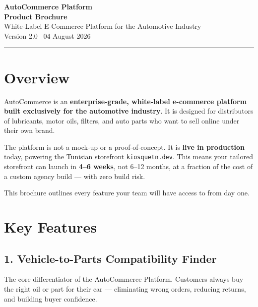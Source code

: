 \documentclass[11pt,a4paper]{article}
\begin{document}
\begin{center}
  {\Huge\bfseries\color{accent}AutoCommerce Platform}\\[0.4em]
  {\large\bfseries Product Brochure}\\[0.2em]
  {\normalsize\color{gray}White-Label E-Commerce Platform for the
  Automotive Industry}\\[0.3em]
  {\normalsize Version 2.0 \textbar\ 04 August 2026}\\[1.2em]
  \rule{\textwidth}{1.2pt}
\end{center}

\section{Overview}

AutoCommerce is an \textbf{enterprise-grade, white-label e-commerce
platform built exclusively for the automotive industry}. It is
designed for distributors of lubricants, motor oils, filters, and
auto parts who want to sell online under their own brand.

The platform is not a mock-up or a proof-of-concept. It is
\textbf{live in production} today, powering the Tunisian storefront
\texttt{kiosquetn.dev}. This means your tailored storefront can launch
in \textbf{4--6 weeks}, not 6--12 months, at a fraction of the cost
of a custom agency build --- with zero build risk.

\medskip
\noindent This brochure outlines every feature your team will have
access to from day one.

\section{Key Features}

\subsection{1. Vehicle-to-Parts Compatibility Finder}

The core differentiator of the AutoCommerce Platform. Customers
always buy the right oil or part for their car --- eliminating wrong
orders, reducing returns, and building buyer confidence.
\end{document}
